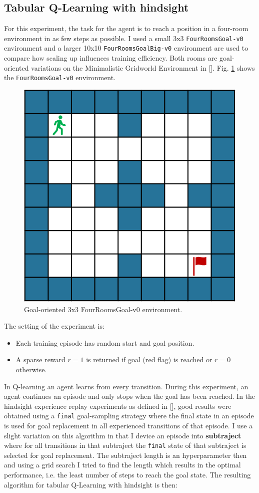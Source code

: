 \documentclass[conference]{IEEEtran}
\begin{document}
\subsection{Tabular Q-Learning with hindsight} \label{subsec:exp_tab_her}
For this experiment, the task for the agent is to reach a position in a four-room environment in as few steps as possible. I used a small 3x3 \texttt{FourRoomsGoal-v0} environment and a larger 10x10 \texttt{FourRoomsGoalBig-v0} environment are used to compare how scaling up influences training efficiency. Both rooms are goal-oriented variations on the Minimalistic Gridworld Environment in [\cite{gym_minigrid}]. Fig. \ref{fig:tabular_fourroomsgoal_env} shows the \texttt{FourRoomsGoal-v0} environment.
\begin{figure}[ht]
\centering
\includegraphics[width=0.5\columnwidth]{img/FourRoomsGoal-v0.png}
\caption{Goal-oriented 3x3 FourRoomsGoal-v0 environment.}
\label{fig:tabular_fourroomsgoal_env}
\end{figure}
The setting of the experiment is:
\begin{itemize}
    \item Each training episode has random start and goal position.
    \item A sparse reward $r = 1$ is returned if goal (red flag) is reached or $r = 0$ otherwise.
\end{itemize}
In Q-learning an agent learns from every transition. During this experiment, an agent continues an episode and only stops when the goal has been reached.
In the hindsight experience replay experiments as defined in [\cite{andrychowicz2017hindsight}], good results were obtained using a \texttt{final} goal-sampling strategy where the final state in an episode is used for goal replacement in all experienced transitions of that episode. I use a slight variation on this algorithm in that I device an episode into \textbf{subtraject} where for all transitions in that subtraject the \texttt{final} state of that subtraject is selected for goal replacement. The subtraject length is an hyperparameter then and using a grid search I tried to find the length which results in the optimal performance, i.e. the least number of steps to reach the goal state. The resulting algorithm for tabular Q-Learning with hindsight is then:
\end{document}
